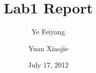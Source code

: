 \documentclass[11pt,oneside,a4paper]{report}
\begin{document}
\title{Lab1 Report}
\author{Ye Feiyang \and Yuan Xiaojie}
\date{July 17, 2012}
\maketitle
\end{document}

